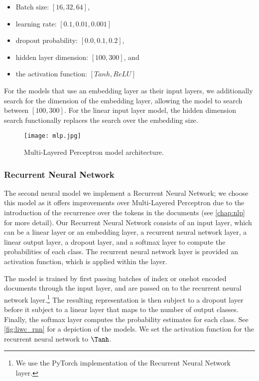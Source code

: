 \begin{itemize}
  \item Batch size: $[16, 32, 64]$,
  \item learning rate: $[0.1, 0.01, 0.001]$
  \item dropout probability: $[0.0, 0.1, 0.2]$,
  \item hidden layer dimension: $[100, 300]$, and
  \item the activation function: $[Tanh, ReLU]$
\end{itemize}

For the models that use an embedding layer as their input layers, we additionally search for the dimension of the embedding layer, allowing the model to search between $[100, 300]$. For the linear input layer model, the hidden dimension search functionally replaces the search over the embedding size.

\begin{figure}
  \centering
  \texttt{[image: mlp.jpg]}
  \caption{Multi-Layered Perceptron model architecture.}
  \label{fig:liwc_mlp}
\end{figure}


\subsubsection{Recurrent Neural Network}

The second neural model we implement a Recurrent Neural Network; we choose this model as it offers improvements over Multi-Layered Perceptron due to the introduction of the recurrence over the tokens in the documents (see \autoref{chap:nlp} for more detail). Our Recurrent Neural Network consists of an input layer, which can be a linear layer or an embedding layer, a recurrent neural network layer, a linear output layer, a dropout layer, and a softmax layer to compute the probabilities of each class. The recurrent neural network layer is provided an activation function, which is applied within the layer. 

The model is trained by first passing batches of index or onehot encoded documents through the input layer, and are passed on to the recurrent neural network layer.\footnote{We use the PyTorch implementation of the Recurrent Neural Network layer.} The resulting representation is then subject to a dropout layer before it subject to a linear layer that maps to the number of output classes. Finally, the softmax layer computes the probability estimates for each class. See \autoref{fig:liwc_rnn} for a depiction of the models. We set the activation function for the recurrent neural network to $\Tanh$.

